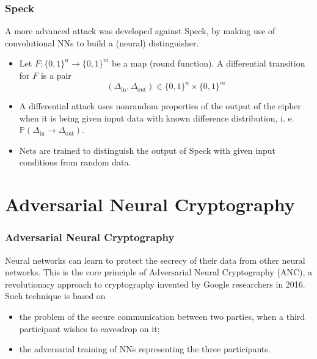 \documentclass{beamer}
\begin{document}
\begin{frame}
\frametitle{Speck}
A more advanced attack was developed against Speck, by making use of convolutional NNs to build a (neural) distinguisher. 
\begin{itemize}
\item Let $F: \{0,1\}^n \longrightarrow \{0,1\}^m$ be a map (round function). A differential transition for $F$ is a pair
$$\left(\Delta_{\text{in}},\Delta_{\text{out}} \right) \in \{0,1\}^n \times \{0,1\}^m$$
\item A differential attack uses nonrandom properties of the output of the cipher when it is being given input data with known difference distribution, i. e. $\mathbb{P}\left( \Delta_{\text{in}} \rightarrow \Delta_{\text{out}}\right)$.
\item Nets are trained to distinguish the output of Speck with given input conditions from random data.
\end{itemize} 
\end{frame}

\section[ANC]{Adversarial Neural Cryptography}
\begin{frame}
\frametitle{Adversarial Neural Cryptography}
Neural networks can learn to protect the secrecy of their data from other neural networks. This is the core principle of Adversarial Neural Cryptography (ANC), a revolutionary approach to cryptography invented by Google researchers in 2016. Such technique is based on\\
\begin{itemize}
\item  the problem of the secure communication between two parties, when a third participant wishes to eavesdrop on it;
\item the adversarial training of NNs representing the three participants.
\end{itemize}


\end{frame}
\end{document}
